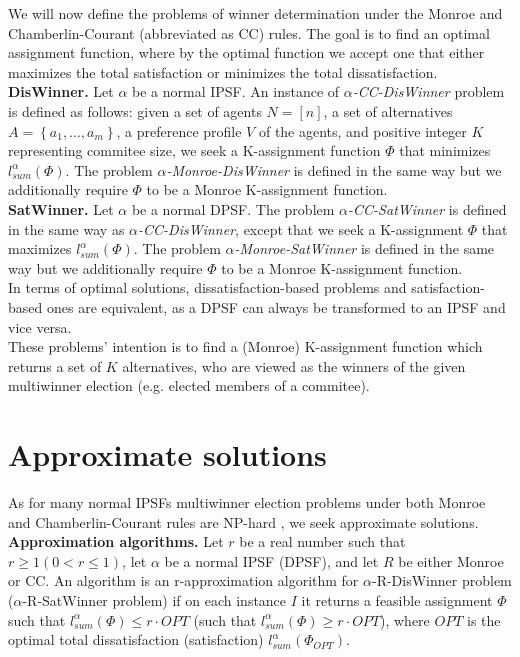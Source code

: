 We will now define the problems of winner determination under the Monroe and Chamberlin-Courant (abbreviated as CC) rules. The goal is to find an optimal assignment function, where by the optimal function we accept one that either maximizes the total satisfaction or minimizes the total dissatisfaction.
\\

\noindent
\textbf{DisWinner.} Let $\alpha$ be a normal IPSF. An instance of $\alpha$\textit{-CC-DisWinner} problem is defined as follows: given a set of agents $N = [n]$, a set of alternatives $A = \left\{ a_{1}, \ldots, a_{m} \right\}$, a preference profile $V$ of the agents, and positive integer $K$ representing commitee size, we seek a K-assignment function $\Phi$ that minimizes $l^{\alpha}_{sum}(\Phi)$. The problem $\alpha$\textit{-Monroe-DisWinner} is defined in the same way but we additionally require $\Phi$ to be a Monroe K-assignment function.
\\

\noindent
\textbf{SatWinner.} Let $\alpha$ be a normal DPSF. The problem $\alpha$\textit{-CC-SatWinner} is defined in the same way as $\alpha$\textit{-CC-DisWinner}, except that we seek a K-assignment $\Phi$ that maximizes $l^{\alpha}_{sum}(\Phi)$. The problem $\alpha$\textit{-Monroe-SatWinner} is defined in the same way but we additionally require $\Phi$ to be a Monroe K-assignment function.
\\

In terms of optimal solutions, dissatisfaction-based problems and satisfaction-based ones are equivalent, as a DPSF can always be transformed to an IPSF and vice versa.
\\

These problems' intention is to find a (Monroe) K-assignment function which returns a set of $K$ alternatives, who are viewed as the winners of the given multiwinner election (e.g. elected members of a commitee).

\section{Approximate solutions}

As for many normal IPSFs multiwinner election problems under both Monroe and Chamberlin-Courant rules are NP-hard \cite{2,3}, we seek approximate solutions.
\\

\noindent
\textbf{Approximation algorithms.} Let $r$ be a real number such that $r \geq 1 (0 < r \leq 1)$, let $\alpha$ be a normal IPSF (DPSF), and let $R$ be either Monroe or CC. An algorithm is an r-approximation algorithm for $\alpha$-R-DisWinner problem ($\alpha$-R-SatWinner problem) if on each instance $I$ it returns a feasible assignment $\Phi$ such that $l^{\alpha}_{sum}(\Phi) \leq r \cdot OPT$ (such that $l^{\alpha}_{sum}(\Phi) \geq r \cdot OPT$), where $OPT$ is the optimal total dissatisfaction (satisfaction) $l^{\alpha}_{sum}(\Phi_{OPT})$.
\\
